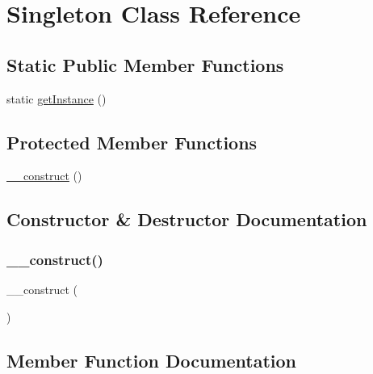 \hypertarget{class_singleton}{}\section{Singleton Class Reference}
\label{class_singleton}
\subsection*{Static Public Member Functions}
\begin{DoxyCompactItemize}
\item 
static \mbox{\hyperlink{class_singleton_ac93fbec81f07e5d15f80db907e63dc10}{get\+Instance}} ()
\end{DoxyCompactItemize}
\subsection*{Protected Member Functions}
\begin{DoxyCompactItemize}
\item 
\mbox{\hyperlink{class_singleton_a095c5d389db211932136b53f25f39685}{\+\_\+\+\_\+construct}} ()
\end{DoxyCompactItemize}


\subsection{Constructor \& Destructor Documentation}
\mbox{\label{class_singleton_a095c5d389db211932136b53f25f39685}} 
\subsubsection{\texorpdfstring{\+\_\+\+\_\+construct()}{\_\_construct()}}
{\footnotesize\ttfamily \+\_\+\+\_\+construct (\begin{DoxyParamCaption}{ }\end{DoxyParamCaption})\hspace{0.3cm}{\ttfamily [protected]}}



\subsection{Member Function Documentation}
\mbox{\label{class_singleton_ac93fbec81f07e5d15f80db907e63dc10}} 
